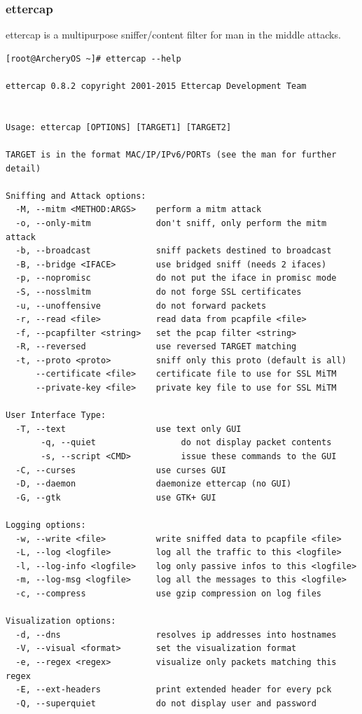 \documentclass{article}
\begin{document}
\subsubsection{ettercap}
ettercap is a multipurpose  sniffer/content filter for man in the middle attacks.
\begin{lstlisting}
[root@ArcheryOS ~]# ettercap --help

ettercap 0.8.2 copyright 2001-2015 Ettercap Development Team


Usage: ettercap [OPTIONS] [TARGET1] [TARGET2]

TARGET is in the format MAC/IP/IPv6/PORTs (see the man for further detail)

Sniffing and Attack options:
  -M, --mitm <METHOD:ARGS>    perform a mitm attack
  -o, --only-mitm             don't sniff, only perform the mitm attack
  -b, --broadcast             sniff packets destined to broadcast
  -B, --bridge <IFACE>        use bridged sniff (needs 2 ifaces)
  -p, --nopromisc             do not put the iface in promisc mode
  -S, --nosslmitm             do not forge SSL certificates
  -u, --unoffensive           do not forward packets
  -r, --read <file>           read data from pcapfile <file>
  -f, --pcapfilter <string>   set the pcap filter <string>
  -R, --reversed              use reversed TARGET matching
  -t, --proto <proto>         sniff only this proto (default is all)
      --certificate <file>    certificate file to use for SSL MiTM
      --private-key <file>    private key file to use for SSL MiTM

User Interface Type:
  -T, --text                  use text only GUI
       -q, --quiet                 do not display packet contents
       -s, --script <CMD>          issue these commands to the GUI
  -C, --curses                use curses GUI
  -D, --daemon                daemonize ettercap (no GUI)
  -G, --gtk                   use GTK+ GUI

Logging options:
  -w, --write <file>          write sniffed data to pcapfile <file>
  -L, --log <logfile>         log all the traffic to this <logfile>
  -l, --log-info <logfile>    log only passive infos to this <logfile>
  -m, --log-msg <logfile>     log all the messages to this <logfile>
  -c, --compress              use gzip compression on log files

Visualization options:
  -d, --dns                   resolves ip addresses into hostnames
  -V, --visual <format>       set the visualization format
  -e, --regex <regex>         visualize only packets matching this regex
  -E, --ext-headers           print extended header for every pck
  -Q, --superquiet            do not display user and password


\end{lstlisting}
\end{document}

